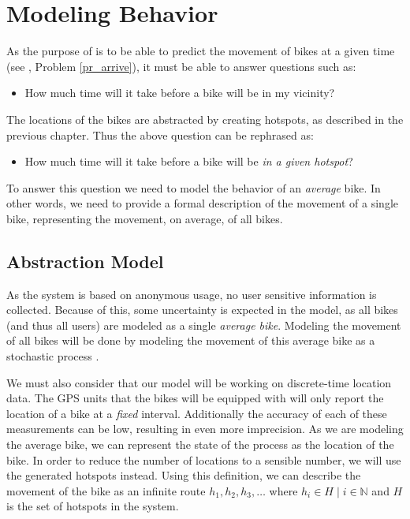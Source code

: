 \section{Modeling Behavior}\label{modelbehavior}
As the purpose of \projectname{} is to be able to predict the movement of bikes at a given time (see , Problem \ref{pr_arrive}), it must be able to answer questions such as: 

\begin{itemize}
\item How much time will it take before a bike will be in my vicinity?
\end{itemize}

The locations of the bikes are abstracted by creating hotspots, as described in the previous chapter.
Thus the above question can be rephrased as: 

\begin{itemize}
\item How much time will it take before a bike will be \emph{in a given hotspot}?
\end{itemize}

To answer this question we need to model the behavior of an \emph{average} bike.
In other words, we need to provide a formal description of the movement of a single bike, representing the movement, on average, of all bikes.

\subsection{Abstraction Model}
As the system is based on anonymous usage, no user sensitive information is collected.
Because of this, some uncertainty is expected in the model, as all bikes (and thus all users) are modeled as a single \textit{average bike}.
Modeling the movement of all bikes will be done by modeling the movement of this average bike as a stochastic process \cite{stochastic}.

We must also consider that our model will be working on discrete-time location data.
The GPS units that the bikes will be equipped with will only report the location of a bike at a \textit{fixed} interval.
Additionally the accuracy of each of these measurements can be low, resulting in even more imprecision.
As we are modeling the average bike, we can represent the state of the process as the location of the bike.
In order to reduce the number of locations to a sensible number, we will use the generated hotspots instead.
Using this definition, we can describe the movement of the bike as an infinite route $h_1, h_2, h_3, \dots$ where $h_i \in H \mid i \in \mathbb{N}$ and $H$ is the set of hotspots in the system.


